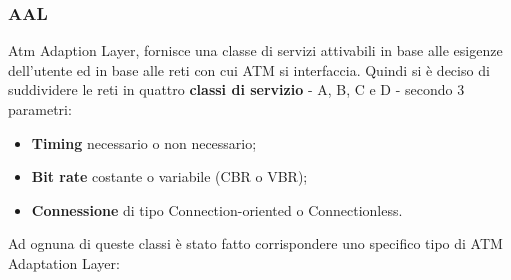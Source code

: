 \documentclass[a4paper,11pt]{article}
\begin{document}
\subsubsection{AAL} Atm Adaption Layer, fornisce una classe di servizi attivabili in base alle esigenze dell'utente ed in base alle reti con cui ATM si interfaccia. Quindi si è deciso di suddividere le reti in quattro \textbf{classi di servizio} - A, B, C e D - secondo 3 parametri:
\begin{itemize}
	\item \textbf{Timing} necessario o non necessario;
	\item \textbf{Bit rate} costante o variabile (CBR o VBR);
	\item \textbf{Connessione} di tipo Connection-oriented o Connectionless.
\end{itemize} 
Ad ognuna di queste classi è stato fatto corrispondere uno specifico tipo di ATM Adaptation Layer:
\end{document}
